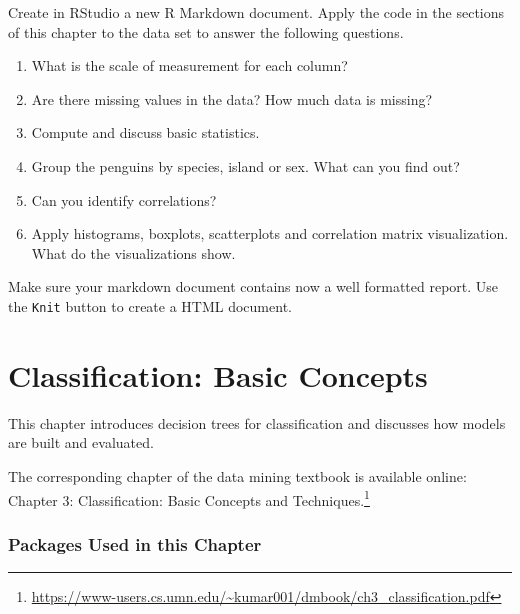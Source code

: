 \documentclass[
  notitlepage]{book}
\DeclareRobustCommand{\href}[2]{#2\footnote{\url{#1}}}
\providecommand{\tightlist}{%
  \setlength{\itemsep}{0pt}\setlength{\parskip}{0pt}}
\begin{document}
Create in RStudio a new R Markdown document.
Apply the code in the sections of this chapter to the data set to answer the
following questions.

\begin{enumerate}
\def\labelenumi{\arabic{enumi}.}
\tightlist
\item
  What is the scale of measurement for each column?
\item
  Are there missing values in the data? How much data is missing?
\item
  Compute and discuss basic statistics.
\item
  Group the penguins by species, island or sex. What can you find out?
\item
  Can you identify correlations?
\item
  Apply histograms, boxplots, scatterplots and correlation matrix visualization.
  What do the visualizations show.
\end{enumerate}

Make sure your markdown document contains now a well formatted report.
Use the \texttt{Knit} button to create a HTML document.

\hypertarget{classification-basic-concepts}{%
\chapter{Classification: Basic Concepts}\label{classification-basic-concepts}}

This chapter introduces decision trees for classification and discusses
how models are built and evaluated.

The corresponding chapter of
the data mining textbook is available online:
\href{https://www-users.cs.umn.edu/~kumar001/dmbook/ch3_classification.pdf}{Chapter 3: Classification: Basic Concepts and Techniques.}

\hypertarget{packages-used-in-this-chapter-1}{%
\subsection*{Packages Used in this Chapter}\label{packages-used-in-this-chapter-1}}
\end{document}
